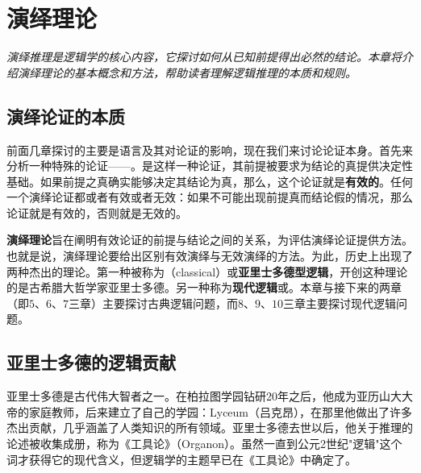 \section{演绎理论}

\begin{logicbox}[title=引言]
\textit{演绎推理是逻辑学的核心内容，它探讨如何从已知前提得出必然的结论。本章将介绍演绎理论的基本概念和方法，帮助读者理解逻辑推理的本质和规则。}
\end{logicbox}

\subsection{演绎论证的本质}

前面几章探讨的主要是语言及其对论证的影响，现在我们来讨论论证本身。首先来分析一种特殊的论证——。是这样一种论证，其前提被要求为结论的真提供决定性基础。如果前提之真确实能够决定其结论为真，那么，这个论证就是\textbf{有效的}。任何一个演绎论证都或者有效或者无效：如果不可能出现前提真而结论假的情况，那么论证就是有效的，否则就是无效的。

\textbf{演绎理论}旨在阐明有效论证的前提与结论之间的关系，为评估演绎论证提供方法。也就是说，演绎理论要给出区别有效演绎与无效演绎的方法。为此，历史上出现了两种杰出的理论。第一种被称为（classical）或\textbf{亚里士多德型逻辑}，开创这种理论的是古希腊大哲学家亚里士多德。另一种称为\textbf{现代逻辑}或。本章与接下来的两章（即$5、6、7$三章）主要探讨古典逻辑问题，而$8、9、10$三章主要探讨现代逻辑问题。

\subsection{亚里士多德的逻辑贡献}

亚里士多德是古代伟大智者之一。在柏拉图学园钻研20年之后，他成为亚历山大大帝的家庭教师，后来建立了自己的学园：Lyceum（吕克昂），在那里他做出了许多杰出贡献，几乎涵盖了人类知识的所有领域。亚里士多德去世以后，他关于推理的论述被收集成册，称为《工具论》（Organon）。虽然一直到公元2世纪"逻辑"这个词才获得它的现代含义，但逻辑学的主题早已在《工具论》中确定了。

